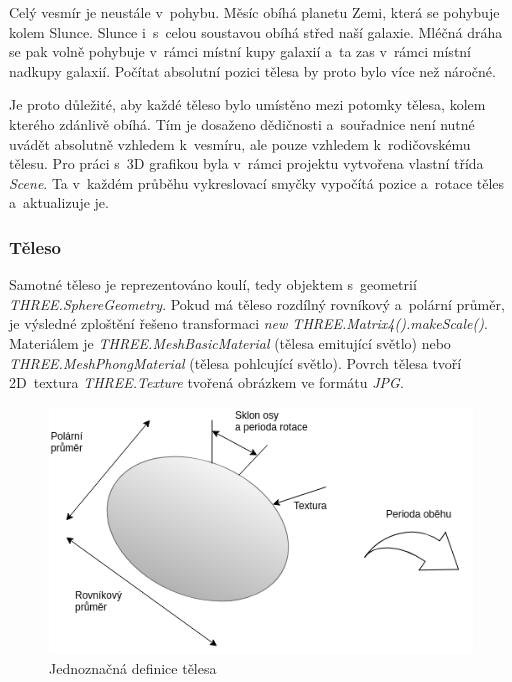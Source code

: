 \documentclass[a4paper,12pt]{article}
\begin{document}
Celý vesmír je neustále v~pohybu. Měsíc obíhá planetu Zemi, která se pohybuje kolem Slunce. Slunce i~s~celou soustavou obíhá střed naší galaxie. Mléčná dráha se pak volně pohybuje v~rámci místní kupy galaxií a~ta zas v~rámci místní nadkupy galaxií. \cite{kleczek}  Počítat absolutní pozici tělesa by proto bylo více než náročné.

Je proto důležité, aby každé těleso bylo umístěno mezi potomky tělesa, kolem kterého zdánlivě obíhá. Tím je dosaženo dědičnosti a~souřadnice není nutné uvádět absolutně vzhledem k~vesmíru, ale pouze vzhledem k~rodičovskému tělesu. Pro práci s~3D grafikou byla v~rámci projektu vytvořena vlastní třída \textit{Scene}. Ta v~každém průběhu vykreslovací smyčky vypočítá pozice a~rotace těles a~aktualizuje je.



\subsubsection{Těleso}

Samotné těleso je reprezentováno koulí, tedy objektem s~geometrií \textit{THREE.SphereGeometry}. Pokud má těleso rozdílný rovníkový a~polární průměr, je výsledné zploštění řešeno transformaci \textit{new THREE.Matrix4().makeScale()}. Materiálem je \textit{THREE.MeshBasicMaterial} (tělesa emitující světlo) nebo \textit{THREE.MeshPhongMaterial} (tělesa pohlcující světlo). Povrch tělesa tvoří 2D~textura \textit{THREE.Texture} tvořená obrázkem ve formátu \textit{JPG}.

\begin{figure}[H]
\begin{center}
\includegraphics[width=370pt]{Images/BodyData.png}
\caption[Jednoznačná definice tělesa]{Jednoznačná definice tělesa \footnotemark[1]}
\end{center}
\end{figure}
\end{document}
